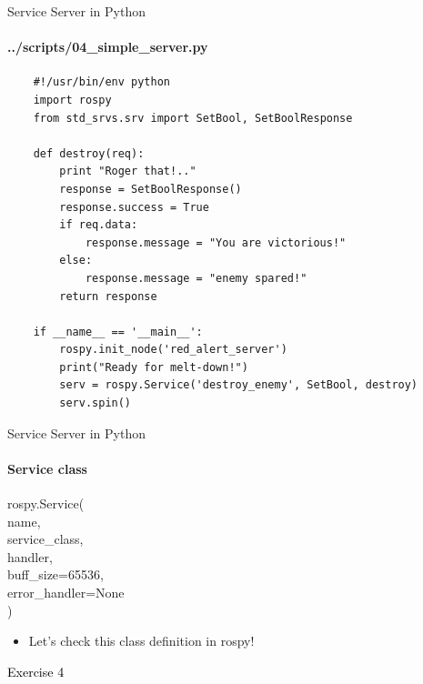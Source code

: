 \documentclass{beamer}
\begin{document}
\begin{frame}{Service Server in Python}
    \framesubtitle{   ../scripts/04\_simple\_server.py}
    \begin{lstlisting}
    #!/usr/bin/env python 
    import rospy
    from std_srvs.srv import SetBool, SetBoolResponse
    
    def destroy(req):
        print "Roger that!.."
        response = SetBoolResponse()
        response.success = True
        if req.data:
            response.message = "You are victorious!"
        else:
            response.message = "enemy spared!"
        return response
    
    if __name__ == '__main__':
        rospy.init_node('red_alert_server')
        print("Ready for melt-down!")
        serv = rospy.Service('destroy_enemy', SetBool, destroy)
        serv.spin()
    \end{lstlisting}
\end{frame}

\begin{frame}[fragile]{Service Server in Python}
    \framesubtitle{Service class}
    \begin{focus}
        
        \ttfamily rospy.Service(\\
        {\color{red}name},\\
        {\color{red}service\_class},\\
        {\color{red} handler},\\
        {\color{blue}buff\_size=65536},\\
        {\color{blue} error\_handler=None}\\
        )
    \end{focus}
    \begin{itemize}
        \item Let's check this class definition in rospy!
    \end{itemize}        
\end{frame}

\begin{frame}[plain]{}  
    \centering
    {\huge \textcolor{black}{Exercise 4}}
\end{frame}
\end{document}
